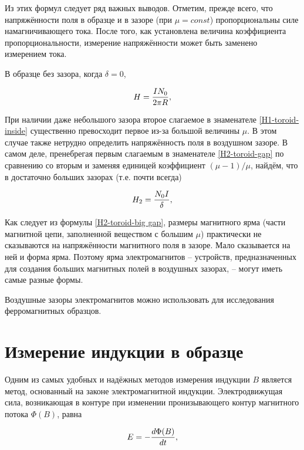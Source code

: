 Из этих формул следует ряд важных выводов. Отметим, прежде всего, что напряжённости поля в образце и в зазоре (при $\mu = const$) пропорциональны силе намагничивающего тока. После того, как установлена величина коэффициента пропорциональности, измерение напряжённости может быть заменено измерением тока.

В образце без зазора, когда $\delta = 0$,


\begin{equation}
	\eqmark{H-toroid-without gap}
	H = \frac{IN_0}{2\pi R},
\end{equation}

При наличии даже небольшого зазора второе слагаемое в знаменателе \eqref{H1-toroid-inside} существенно превосходит первое из-за большой величины $\mu$. В этом случае также нетрудно определить напряжённость поля в воздушном зазоре. В самом деле, пренебрегая первым слагаемым в знаменателе \eqref{H2-toroid-gap} по сравнению со вторым и заменяя единицей коэффициент $(\mu - 1)/\mu$, найдём, что в достаточно больших зазорах (т.е. почти всегда)

\begin{equation}
	\eqmark{H2-toroid-big gap}
	H_2 = \frac{N_0 I}{\delta},
\end{equation}

Как следует из формулы \eqref{H2-toroid-big gap}, размеры магнитного ярма (части магнитной цепи, заполненной веществом с большим $\mu$) практически не сказываются на напряжённости магнитного поля в зазоре. Мало сказывается на ней и форма ярма. Поэтому ярма электромагнитов -- устройств, предназначенных для создания больших магнитных полей в воздушных зазорах, -- могут иметь самые разные формы.

Воздушные зазоры электромагнитов можно использовать для исследования ферромагнитных образцов.

\section{Измерение индукции в образце}

Одним из самых удобных и надёжных методов измерения индукции $B$ является метод, основанный на законе электромагнитной индукции. Электродвижущая сила, возникающая в контуре при изменении пронизывающего контур магнитного потока $\Phi (B)$, равна

\begin{equation}
	\eqmark{EMF-magnetic flux}
	E = - \frac{d\Phi (B)}{dt},
\end{equation}

